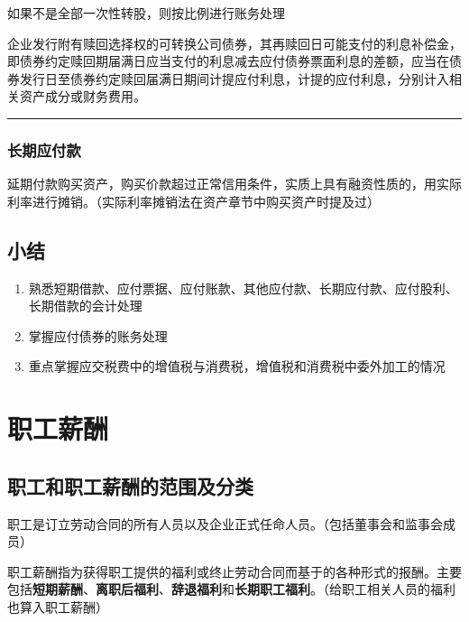 \documentclass[UTF8,12pt]{ctexart}
\numberwithin{equation}{section} %
\numberwithin{figure}{section}
\numberwithin{table}{section}
\begin{document}
	如果不是全部一次性转股，则按比例进行账务处理  
	
	企业发行附有赎回选择权的可转换公司债券，其再赎回日可能支付的利息补偿金，即债券约定赎回期届满日应当支付的利息减去应付债券票面利息的差额，应当在债券发行日至债券约定赎回届满日期间计提应付利息，计提的应付利息，分别计入相关资产成分或财务费用。
	
	\vspace{5pt}
	\hrule
	\vspace{5pt}
	
	\subsubsection{长期应付款}
	延期付款购买资产，购买价款超过正常信用条件，实质上具有融资性质的，用实际利率进行摊销。（实际利率摊销法在资产章节中购买资产时提及过）
	
	\subsection{小结}
	\begin{enumerate}
		\item 熟悉短期借款、应付票据、应付账款、其他应付款、长期应付款、应付股利、长期借款的会计处理
		
		\item 掌握应付债券的账务处理
		
		\item 重点掌握应交税费中的增值税与消费税，增值税和消费税中委外加工的情况
	\end{enumerate}
	
	\newpage
	\section{职工薪酬}
	
	\subsection{职工和职工薪酬的范围及分类}
	职工是订立劳动合同的所有人员以及企业正式任命人员。（包括董事会和监事会成员）
	
	职工薪酬指为获得职工提供的福利或终止劳动合同而基于的各种形式的报酬。主要包括\textbf{短期薪酬}、\textbf{离职后福利}、\textbf{辞退福利}和\textbf{长期职工福利}。（给职工相关人员的福利也算入职工薪酬）
	
\end{document}
